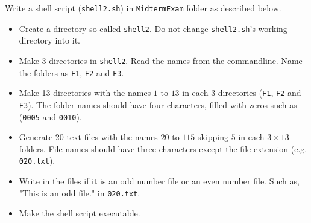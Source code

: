 \question[25]

Write a shell script (\texttt{shell2.sh}) in \texttt{MidtermExam} folder as described below.
\begin{itemize}
\item Create a directory so called \texttt{shell2}. Do not change \texttt{shell2.sh}'s working directory into it.
\item Make 3 directories in \texttt{shell2}. Read the names from the commandline. Name the folders as \texttt{F1}, \texttt{F2} and \texttt{F3}.
\item Make 13 directories with the names $1$ to $13$ in each $3$ directories (\texttt{F1}, \texttt{F2} and \texttt{F3}). The folder names should have four characters, filled with zeros such as (\texttt{0005} and \texttt{0010}). 
\item Generate 20 text files with the names $20$ to $115$ skipping $5$ in each $3\times13$ folders. File names should have three characters except the file extension (e.g. \texttt{020.txt}).
\item Write in the files if it is an odd number file or an even number file. Such as, "This is an odd file." in \texttt{020.txt}.
\item Make the shell script executable.
\end{itemize}

